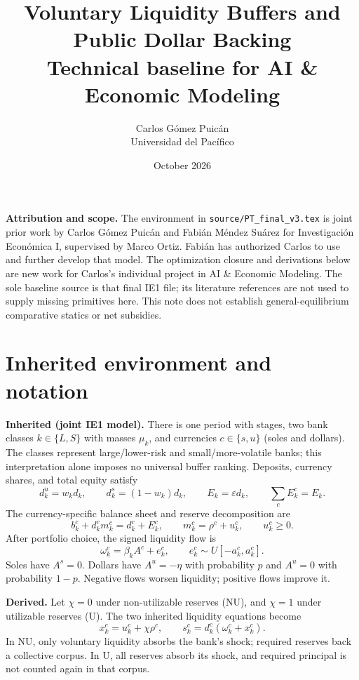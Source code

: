 \documentclass[11pt,a4paper]{article}
\title{Voluntary Liquidity Buffers and Public Dollar Backing\\\large Technical baseline for AI \& Economic Modeling}
\author{Carlos G\'omez Puic\'an\\Universidad del Pac\'ifico}
\date{October 2026}
\newcommand{\inh}{\textbf{Inherited (joint IE1 model).}}
\newcommand{\der}{\textbf{Derived.}}
\begin{document}
\maketitle
\textbf{Attribution and scope.} The environment in \texttt{source/PT\_final\_v3.tex} is joint prior work by Carlos G\'omez Puic\'an and Fabi\'an M\'endez Su\'arez for Investigaci\'on Econ\'omica I, supervised by Marco Ortiz. Fabi\'an has authorized Carlos to use and further develop that model. The optimization closure and derivations below are new work for Carlos's individual project in AI \& Economic Modeling. The sole baseline source is that final IE1 file; its literature references are not used to supply missing primitives here. This note does not establish general-equilibrium comparative statics or net subsidies.

\section{Inherited environment and notation}
\inh{} There is one period with stages, two bank classes $k\in\{L,S\}$ with masses $\mu_k$, and currencies $c\in\{s,u\}$ (soles and dollars). The classes represent large/lower-risk and small/more-volatile banks; this interpretation alone imposes no universal buffer ranking. Deposits, currency shares, and total equity satisfy
\begin{equation}
 d_k^u=w_kd_k,\qquad d_k^s=(1-w_k)d_k,\qquad
 E_k=\varepsilon d_k,\qquad \sum_c E_k^c=E_k.
\end{equation}
The currency-specific balance sheet and reserve decomposition are
\begin{equation}\label{eq:balance}
 b_k^c+d_k^cm_k^c=d_k^c+E_k^c,\qquad
 m_k^c=\rho^c+u_k^c,\qquad u_k^c\geq0.
\end{equation}
After portfolio choice, the signed liquidity flow is
\begin{equation}
 \omega_k^c=\beta_kA^c+e_k^c,\qquad e_k^c\sim U[-a_k^c,a_k^c].
\end{equation}
Soles have $A^s=0$. Dollars have $A^u=-\eta$ with probability $p$ and $A^u=0$ with probability $1-p$. Negative flows worsen liquidity; positive flows improve it.

\der{} Let $\chi=0$ under non-utilizable reserves (NU), and $\chi=1$ under utilizable reserves (U). The two inherited liquidity equations become
\begin{equation}\label{eq:position}
 x_k^c=u_k^c+\chi\rho^c,\qquad
 s_k^c=d_k^c(\omega_k^c+x_k^c).
\end{equation}
In NU, only voluntary liquidity absorbs the bank's shock; required reserves back a collective corpus. In U, all reserves absorb its shock, and required principal is not counted again in that corpus.
\end{document}
